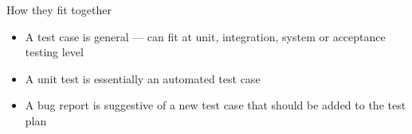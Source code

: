 \begin{frame}{How they fit together}
    \begin{itemize}
        \pause\item A test case is general --- can fit at unit, integration, system or acceptance testing level
        \pause\item A unit test is essentially an automated test case
        \pause\item A bug report is suggestive of a new test case that should be added to the test plan
    \end{itemize}
\end{frame}
